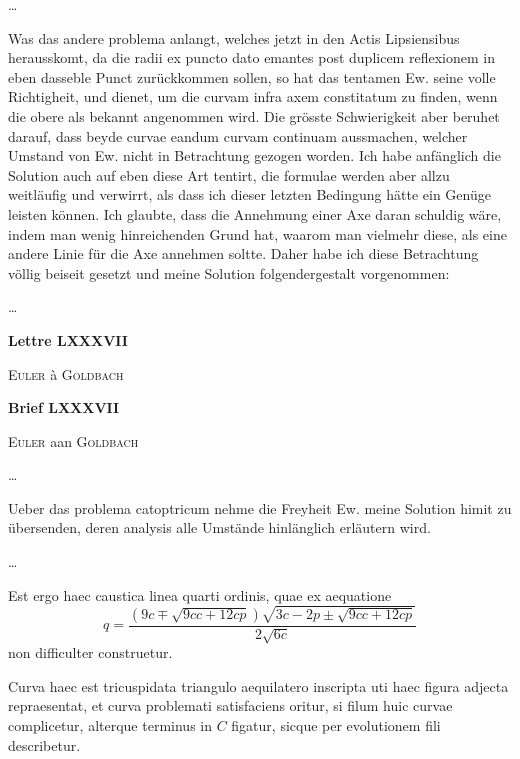 \documentclass[10pt,a4paper]{article}
\begin{document}
\begin{paracol}{2}
	\par \ldots
	\par Was das andere problema anlangt, welches jetzt in den Actis Lipsiensibus herausskomt, da die radii ex puncto dato emantes post duplicem reflexionem in eben dasseble Punct zurückkommen sollen, so hat das tentamen Ew. seine volle Richtigheit, und dienet, um die curvam infra axem constitatum zu finden, wenn die obere als bekannt angenommen wird. Die grösste Schwierigkeit aber beruhet darauf, dass beyde curvae eandum curvam continuam aussmachen, welcher Umstand von Ew. nicht in Betrachtung gezogen worden. Ich habe anfänglich die Solution auch auf eben diese Art tentirt, die formulae werden aber allzu weitläufig und verwirrt, als dass ich dieser letzten Bedingung hätte ein Genüge leisten können. Ich glaubte, dass die Annehmung einer Axe daran schuldig wäre, indem man wenig hinreichenden Grund hat, waarom man vielmehr diese, als eine andere Linie für die Axe annehmen soltte. Daher habe ich diese Betrachtung völlig beiseit gesetzt und meine Solution folgendergestalt vorgenommen:
	
	
	\switchcolumn
	\par \ldots
	
	\switchcolumn*
	\begin{center}
		\par {}
		\par {\bf Lettre LXXXVII}
		\par {\textsc{Euler} à \textsc{Goldbach} }
	\end{center}
	\switchcolumn
	
	\begin{center}
		\par {}
		\par {\bf Brief LXXXVII}
		\par {\textsc{Euler} aan \textsc{Goldbach} }
	\end{center}
	\switchcolumn*
	
	\par \ldots
	\par Ueber das problema catoptricum nehme die Freyheit Ew. meine Solution himit zu übersenden, deren analysis alle Umstände hinlänglich erläutern wird.
	\par \ldots
	\par Est ergo haec caustica linea quarti ordinis, quae ex aequatione
	\[
		q = \frac{(9c\mp \sqrt{9cc+12cp})\sqrt{3c-2p\pm \sqrt{9cc+12cp}}}{2\sqrt{6c}}
	\]
	non difficulter construetur.
	\par Curva haec est tricuspidata triangulo aequilatero inscripta uti haec figura adjecta repraesentat, et curva problemati satisfaciens oritur, si filum huic curvae complicetur, alterque terminus in $C$ figatur, sicque per evolutionem fili describetur.
	

\end{paracol}
\end{document}
